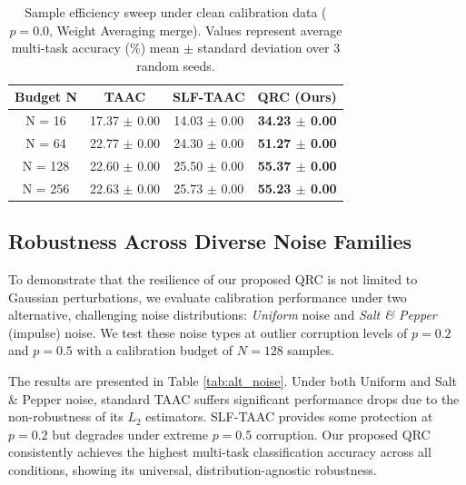 \documentclass{article}
\theoremstyle{plain}
\theoremstyle{definition}
\theoremstyle{remark}
\begin{document}
\begin{table}[t]
  \caption{Sample efficiency sweep under clean calibration data ($p=0.0$, Weight Averaging merge). Values represent average multi-task accuracy (\%) mean $\pm$ standard deviation over 3 random seeds.}
  \label{tab:sweep2}
  \vskip 0.1in
  \begin{center}
    \begin{small}
      \begin{tabular}{cccc}
        \toprule
        \textbf{Budget N} & \textbf{TAAC} & \textbf{SLF-TAAC} & \textbf{QRC (Ours)} \\
        \midrule
        N = 16  & 17.37 $\pm$ 0.00 & 14.03 $\pm$ 0.00 & \textbf{34.23 $\pm$ 0.00} \\
        N = 64  & 22.77 $\pm$ 0.00 & 24.30 $\pm$ 0.00 & \textbf{51.27 $\pm$ 0.00} \\
        N = 128 & 22.60 $\pm$ 0.00 & 25.50 $\pm$ 0.00 & \textbf{55.37 $\pm$ 0.00} \\
        N = 256 & 22.63 $\pm$ 0.00 & 25.73 $\pm$ 0.00 & \textbf{55.23 $\pm$ 0.00} \\
        \bottomrule
      \end{tabular}
    \end{small}
  \end{center}
  \vskip -0.1in
\end{table}


\subsection{Robustness Across Diverse Noise Families}
To demonstrate that the resilience of our proposed QRC is not limited to Gaussian perturbations, we evaluate calibration performance under two alternative, challenging noise distributions: \textit{Uniform} noise and \textit{Salt \& Pepper} (impulse) noise. We test these noise types at outlier corruption levels of $p=0.2$ and $p=0.5$ with a calibration budget of $N=128$ samples.

The results are presented in Table \ref{tab:alt_noise}. Under both Uniform and Salt \& Pepper noise, standard TAAC suffers significant performance drops due to the non-robustness of its $L_2$ estimators. SLF-TAAC provides some protection at $p=0.2$ but degrades under extreme $p=0.5$ corruption. Our proposed QRC consistently achieves the highest multi-task classification accuracy across all conditions, showing its universal, distribution-agnostic robustness.
\end{document}
